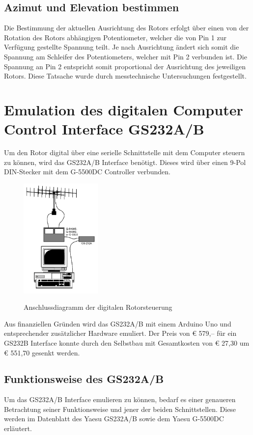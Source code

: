 \subsection {Azimut und Elevation bestimmen}
Die Bestimmung der aktuellen Ausrichtung des Rotors erfolgt über einen von der Rotation des Rotors abhängigen Potentiometer, welcher die von Pin 1 zur Verfügung gestellte Spannung teilt. Je nach Ausrichtung ändert sich somit die Spannung am Schleifer des Potentiometers, welcher mit Pin 2 verbunden ist. Die Spannung an Pin 2 entspricht somit proportional der Ausrichtung des jeweiligen Rotors. Diese Tatsache wurde durch messtechnische Untersuchungen festgestellt.

\section{Emulation des digitalen Computer Control Interface GS232A/B}
\label{sec:gs232emulation}
Um den Rotor digital über eine serielle Schnittstelle mit dem Computer steuern zu können, wird das GS232A/B Interface benötigt. Dieses wird über einen 9-Pol DIN-Stecker mit dem G-5500DC Controller verbunden. 
\begin{figure}[H]
	\centering
	\includegraphics[width=4cm]{../ref/GS232_Prinzipschaltbild.png}
	\label{fig:Rotor_Prinzipschaltbild}
	\caption{Anschlussdiagramm der digitalen Rotorsteuerung \cite{noauthor_yaesu_nodate}}
\end{figure}
Aus finanziellen Gründen wird das GS232A/B mit einem Arduino Uno und entsprechender zusätzlicher Hardware emuliert. Der Preis von € 579,-- für ein GS232B Interface \cite{noauthor_yaesuinterface_nodate} konnte durch den Selbstbau mit Gesamtkosten von € 27,30 um € 551,70 gesenkt werden.

\subsection{Funktionsweise des GS232A/B}
Um das GS232A/B Interface emulieren zu können, bedarf es einer genaueren Betrachtung seiner Funktionsweise und jener der beiden Schnittstellen. Diese werden im Datenblatt des Yaesu GS232A/B \cite{noauthor_yaesu_nodate} sowie dem Yaesu G-5500DC \cite{noauthor_yaesu_nodate} erläutert.

